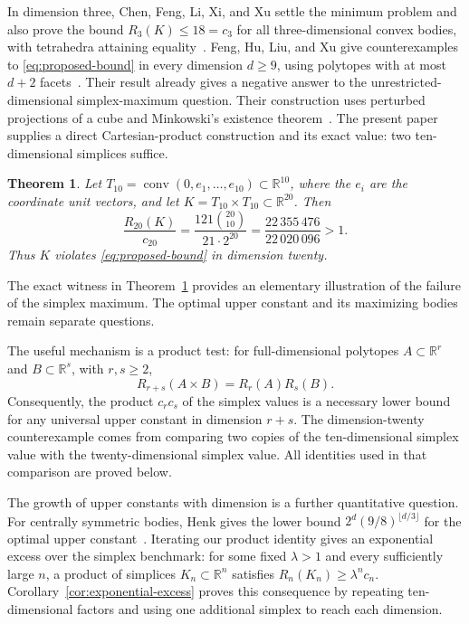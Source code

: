 \documentclass[11pt]{article}
\newtheorem{theorem}{Theorem}
\newcommand{\R}{\mathbb R}
\DeclareMathOperator{\conv}{conv}
\begin{document}
In dimension three, Chen, Feng, Li, Xi, and Xu settle the minimum problem
and also prove
the bound \(R_3(K)\le18=c_3\) for all
three-dimensional convex bodies, with tetrahedra attaining
equality~\cite[Theorems~1.1 and~1.2]{ChenEtAl}. Feng, Hu, Liu, and Xu give
counterexamples to \eqref{eq:proposed-bound} in every dimension
\(d\ge9\), using polytopes with at most \(d+2\)
facets~\cite[Theorem~1.3]{FengEtAl}. Their result already gives a
negative answer to the unrestricted-dimensional simplex-maximum
question. Their construction uses perturbed projections of a cube and
Minkowski's existence theorem~\cite[Section~4]{FengEtAl}. The present
paper supplies a direct Cartesian-product construction and its exact
value: two ten-dimensional simplices suffice.

\begin{theorem}\label{thm:counterexample}
Let \(T_{10}=\conv(0,e_1,\ldots,e_{10})\subset\R^{10}\), where the
\(e_i\) are the coordinate unit vectors, and let
\(K=T_{10}\times T_{10}\subset\R^{20}\). Then
\[
 \frac{R_{20}(K)}{c_{20}}
 =\frac{121\binom{20}{10}}{21\cdot2^{20}}
 =\frac{22\,355\,476}{22\,020\,096}>1.
\]
Thus \(K\) violates \eqref{eq:proposed-bound} in dimension twenty.
\end{theorem}

The exact witness in Theorem~\ref{thm:counterexample} provides an
elementary illustration of the failure of the simplex maximum. The
optimal upper constant and its maximizing bodies remain separate
questions.

The useful mechanism is a product test: for full-dimensional polytopes
\(A\subset\R^r\) and \(B\subset\R^s\), with \(r,s\ge2\),
\[
 R_{r+s}(A\times B)=R_r(A)R_s(B).
\]
Consequently, the product \(c_rc_s\) of the simplex values is a necessary
lower bound for any universal upper constant in dimension \(r+s\). The
dimension-twenty counterexample comes from comparing two copies of the
ten-dimensional simplex value with the twenty-dimensional simplex value.
All identities used in that comparison are proved below.

The growth of upper constants with dimension is a further quantitative
question. For centrally symmetric bodies, Henk gives the lower bound
\(2^d(9/8)^{\lfloor d/3\rfloor}\) for the optimal upper
constant~\cite{Henk}. Iterating our product identity gives an exponential
excess over the simplex benchmark: for some fixed \(\lambda>1\) and
every sufficiently large \(n\), a product of simplices
\(K_n\subset\R^n\) satisfies \(R_n(K_n)\ge\lambda^n c_n\).
Corollary~\ref{cor:exponential-excess} proves this consequence by
repeating ten-dimensional factors and using one additional simplex to
reach each dimension.
\end{document}
